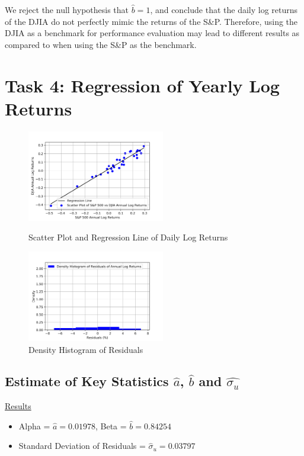 \documentclass[a4paper]{article}
\begin{document}
	We reject the null hypothesis that $\hat{b}=1$, and conclude that the daily log returns of the DJIA do not perfectly mimic the returns of the S\&P. Therefore, using the DJIA as a benchmark for performance evaluation may lead to different results as compared to when using the S\&P as the benchmark. 
		
	\section*{Task 4: Regression of Yearly Log Returns}
	\label{sec:num2}
	
	\begin{figure}[htbp]
		\centering
		\begin{minipage}[t]{0.48\textwidth}
			\centering
			\includegraphics[width=6cm]{Ann_Scatter.png}
			\captionsetup{font=small}
			\caption{Scatter Plot and Regression Line of Daily Log Returns}
		\end{minipage}
		\begin{minipage}[t]{0.48\textwidth}
			\centering
			\includegraphics[width=6cm]{Ann_Hist.png}
			\captionsetup{font=small}
			\caption{Density Histogram of Residuals}
		\end{minipage}
	\end{figure}
	
	\subsection{Estimate of Key Statistics $\hat{a}$, $\hat{b}$ and $\hat{\sigma_u}$}
	\underline{Results}
	\begin{itemize}[nosep]
		\item Alpha = $\hat{a} = 0.01978$, Beta = $\hat{b} = 0.84254$
		\item Standard Deviation of Residuals = $\hat{\sigma}_{u} = 0.03797$
	\end{itemize}
\end{document}
